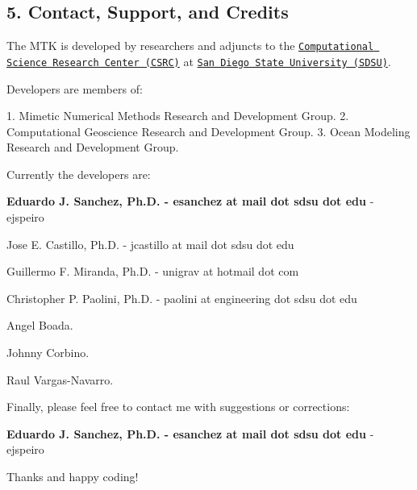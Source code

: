 \begin{DoxyPre}\subsection*{5. Contact, Support, and Credits}\end{DoxyPre}



\begin{DoxyPre}\end{DoxyPre}



\begin{DoxyPre}The MTK is developed by researchers and adjuncts to the
\href{http://www.csrc.sdsu.edu/}{\tt Computational Science Research Center (CSRC)}
at \href{http://www.sdsu.edu/}{\tt San Diego State University (SDSU)}.\end{DoxyPre}



\begin{DoxyPre}Developers are members of:\end{DoxyPre}



\begin{DoxyPre}1. Mimetic Numerical Methods Research and Development Group.
2. Computational Geoscience Research and Development Group.
3. Ocean Modeling Research and Development Group.\end{DoxyPre}



\begin{DoxyPre}Currently the developers are:\end{DoxyPre}



\begin{DoxyPre}
\begin{DoxyEnumerate}
\item {\bfseries Eduardo J. Sanchez, Ph.D. - esanchez at mail dot sdsu dot edu} - ejspeiro
\item Jose E. Castillo, Ph.D. - jcastillo at mail dot sdsu dot edu
\item Guillermo F. Miranda, Ph.D. - unigrav at hotmail dot com
\item Christopher P. Paolini, Ph.D. - paolini at engineering dot sdsu dot edu
\item Angel Boada.
\item Johnny Corbino.
\item Raul Vargas-Navarro.
\end{DoxyEnumerate}\end{DoxyPre}



\begin{DoxyPre}Finally, please feel free to contact me with suggestions or corrections:\end{DoxyPre}



\begin{DoxyPre}{\bfseries Eduardo J. Sanchez, Ph.D. - esanchez at mail dot sdsu dot edu} - ejspeiro\end{DoxyPre}



\begin{DoxyPre}Thanks and happy coding!
\end{DoxyPre}
 